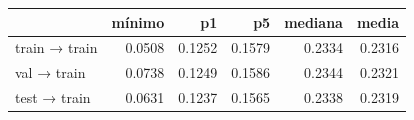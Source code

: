\begin{tabular}{lrrrrr}
\toprule
 & mínimo & p1 & p5 & mediana & media \\
\midrule
train → train & 0.0508 & 0.1252 & 0.1579 & 0.2334 & 0.2316 \\
val → train & 0.0738 & 0.1249 & 0.1586 & 0.2344 & 0.2321 \\
test → train & 0.0631 & 0.1237 & 0.1565 & 0.2338 & 0.2319 \\
\bottomrule
\end{tabular}
